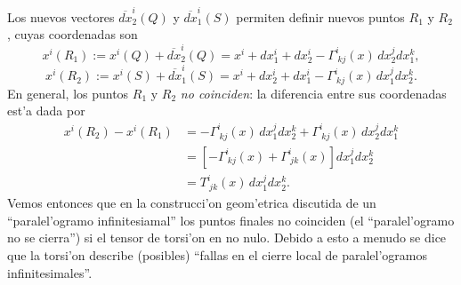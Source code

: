 Los nuevos vectores $\overline{dx}_2^i (Q)$ y $\overline{dx}_1^i (S)$ permiten definir nuevos puntos $R_1$ y $R_2$, cuyas coordenadas son
\begin{equation}
x^i(R_1):=x^i(Q)+\overline{dx}_2^i (Q)=x^i+dx_1^i+dx_2^i -\Gamma_{\ kj}^i(x)\, dx_2^j dx_1^k, 
\end{equation}
\begin{equation}
x^i(R_2):=x^i(S)+\overline{dx}_1^i (S)=x^i +dx_2^i +dx_1^i
 -\Gamma_{\ kj}^i(x)\, dx_1^j dx_2^k .
\end{equation}
En general, los puntos $R_1$ y $R_2$ \textit{no coinciden}: la diferencia entre sus coordenadas est'a dada por
\begin{align}
x^i(R_2)-x^i(R_1) &= -\Gamma_{\ kj}^i(x)\, dx_1^j dx_2^k+ \Gamma_{\ kj}^i(x)\, dx_2^j dx_1^k \\
&=  \left[-\Gamma_{\ kj}^i(x)+ \Gamma_{\ jk}^i(x)\right] dx_1^j dx_2^k \\
&=  T_{\ jk}^i(x)\, dx_1^j dx_2^k .
\end{align}
Vemos entonces que en la construcci'on geom'etrica discutida de un ``paralel'ogramo infinitesiamal'' los puntos finales no coinciden (el ``paralel'ogramo no se cierra'') si el tensor de torsi'on en no nulo. Debido a esto a menudo se dice que la torsi'on describe (posibles) ``fallas en el cierre local de paralel'ogramos infinitesimales''.



